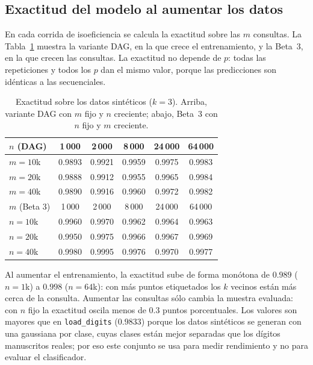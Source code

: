 \documentclass[11pt,a4paper]{article}
\newcommand{\ntr}{n}   %
\newcommand{\mte}{m}   %
\begin{document}
\subsection{Exactitud del modelo al aumentar los datos}
\label{sec:exactitud}
En cada corrida de isoeficiencia se calcula la exactitud sobre las $\mte$ consultas. La
Tabla~\ref{tab:exactitud} muestra la variante DAG, en la que crece el entrenamiento, y la Beta~3,
en la que crecen las consultas. La exactitud no depende de $p$: todas las repeticiones y todos los
$p$ dan el mismo valor, porque las predicciones son idénticas a las secuenciales.

\begin{table}[H]
\centering
\caption{Exactitud sobre los datos sintéticos ($k=3$). Arriba, variante DAG con $\mte$ fijo y
$\ntr$ creciente; abajo, Beta~3 con $\ntr$ fijo y $\mte$ creciente.}
\label{tab:exactitud}
\small
\begin{tabular}{lccccc}
\toprule
$\ntr$ (DAG) & 1\,000 & 2\,000 & 8\,000 & 24\,000 & 64\,000\\
\midrule
$\mte=10$k & 0.9893 & 0.9921 & 0.9959 & 0.9975 & 0.9983\\
$\mte=20$k & 0.9888 & 0.9912 & 0.9955 & 0.9965 & 0.9984\\
$\mte=40$k & 0.9890 & 0.9916 & 0.9960 & 0.9972 & 0.9982\\
\midrule
$\mte$ (Beta 3) & 1\,000 & 2\,000 & 8\,000 & 24\,000 & 64\,000\\
\midrule
$\ntr=10$k & 0.9960 & 0.9970 & 0.9962 & 0.9964 & 0.9963\\
$\ntr=20$k & 0.9950 & 0.9975 & 0.9966 & 0.9967 & 0.9969\\
$\ntr=40$k & 0.9980 & 0.9995 & 0.9976 & 0.9970 & 0.9977\\
\bottomrule
\end{tabular}
\end{table}

Al aumentar el entrenamiento, la exactitud sube de forma monótona de $0.989$ ($\ntr=1$k) a $0.998$
($\ntr=64$k): con más puntos etiquetados los $k$ vecinos están más cerca de la consulta. Aumentar
las consultas sólo cambia la muestra evaluada: con $\ntr$ fijo la exactitud oscila menos de 0.3
puntos porcentuales. Los valores son mayores que en \texttt{load\_digits} ($0.9833$) porque los datos
sintéticos se generan con una gaussiana por clase, cuyas clases están mejor separadas que los dígitos
manuscritos reales; por eso este conjunto se usa para medir rendimiento y no para evaluar el
clasificador.
\end{document}
